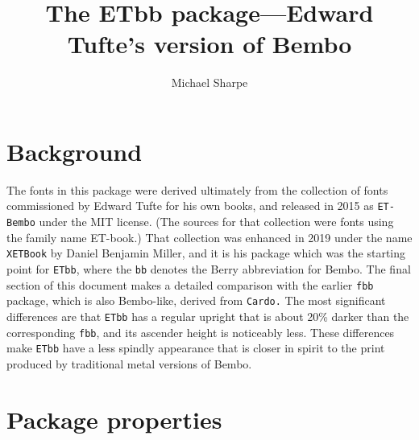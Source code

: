 \documentclass[11pt]{article}
\title{The \textbf{ETbb} package---Edward Tufte's version of Bembo}
\author{Michael Sharpe}
\date{}
\begin{document}
\maketitle
\section*{Background}


The fonts in this package were derived ultimately from the collection of fonts commissioned by Edward Tufte for his own books, and released in 2015 as {\tt ET-Bembo} under the MIT license. (The sources for that collection were fonts using the family name ET-book.) That collection was enhanced in 2019 under the name {\tt XETBook} by  Daniel Benjamin Miller, and it is his package which was the starting point for {\tt ETbb}, where the {\tt bb} denotes the Berry abbreviation for Bembo. The final section of this document makes a detailed comparison with the earlier {\tt fbb} package, which is also  Bembo-like, derived from {\tt Cardo.} The most significant differences are that {\tt ETbb} has a regular upright that is about 20\% darker than the corresponding {\tt fbb}, and its ascender height is noticeably less. These differences make {\tt ETbb} have a less spindly appearance that is closer in spirit to the print produced by traditional metal versions of Bembo.


\section*{Package properties}
\end{document}
